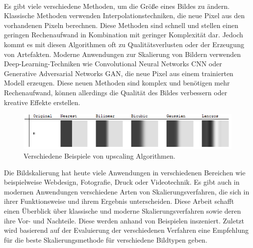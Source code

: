     ~
    
    Es gibt viele verschiedene Methoden, um die Größe eines Bildes zu ändern. 
    Klassische Methoden verwenden Interpolationstechniken, die neue Pixel aus den vorhandenen Pixeln berechnen. 
    Diese Methoden sind schnell und stellen einen geringen Rechenaufwand in Kombination mit geringer Komplexität dar. 
    Jedoch kommt es mit diesen Algorithmen oft zu Qualitätsverlusten oder der Erzeugung von Artefakten. 
    Moderne Anwendungen zur Skalierung von Bildern verwenden Deep-Learning-Techniken wie Convolutional Neural Networks \ac{CNN} oder Generative Adversarial Networks \ac{GAN}, die neue Pixel aus einem trainierten Modell erzeugen. 
    Diese neuen Methoden sind komplex und benötigen mehr Rechenaufwand, können allerdings die Qualität des Bildes verbessern oder kreative Effekte erstellen.
    
    \begin{figure}[h!]
        \vspace{8mm}
        \centering
        \includegraphics{img/xaR8r.png}
        \caption{Verschiedene Beispiele von upscaling Algorithmen\cite{whuber.lanczos}.}
        \label{fig:my_label}
        \vspace{4mm}
    \end{figure}
    
    Die Bildskalierung hat heute viele Anwendungen in verschiedenen Bereichen wie beispielweise Webdesign, Fotografie, Druck oder Videotechnik. 
    Es gibt auch in modernen Anwendungen verschiedene Arten von Skalierungsverfahren, die sich in ihrer Funktionsweise und ihrem Ergebnis unterscheiden. 
    Diese Arbeit schafft einen Überblick über klassische und moderne Skalierungsverfahren sowie deren ihre Vor- und Nachteile. 
    Diese werden anhand von Beispielen inszeniert. 
    Zuletzt wird basierend auf der Evaluierung der verschiedenen Verfahren eine Empfehlung für die beste Skalierungsmethode für verschiedene Bildtypen geben. 
    
    ~

